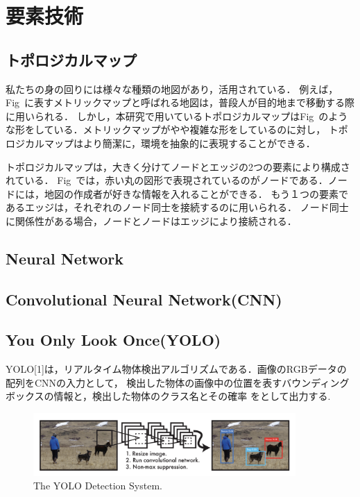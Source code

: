 \documentclass[../main]{subfiles}
\begin{document}
\setcounter{secnumdepth}{3}
    \chapter{要素技術}
        \section{トポロジカルマップ}
        私たちの身の回りには様々な種類の地図があり，活用されている．
        例えば，Fig~に表すメトリックマップと呼ばれる地図は，普段人が目的地まで移動する際に用いられる．
        しかし，本研究で用いているトポロジカルマップはFig~のような形をしている．メトリックマップがやや複雑な形をしているのに対し，
        トポロジカルマップはより簡潔に，環境を抽象的に表現することができる．

        
        トポロジカルマップは，大きく分けてノードとエッジの2つの要素により構成されている．
        Fig~では，赤い丸の図形で表現されているのがノードである．ノードには，地図の作成者が好きな情報を入れることができる．
        もう１つの要素であるエッジは，それぞれのノード同士を接続するのに用いられる．
        ノード同士に関係性がある場合，ノードとノードはエッジにより接続される．
        \section{Neural Network}
        \section{Convolutional Neural Network(CNN)}
        \section{You Only Look Once(YOLO)}
        YOLO[1]は，リアルタイム物体検出アルゴリズムである．画像のRGBデータの配列をCNNの入力として，
        検出した物体の画像中の位置を表すバウンディングボックスの情報と，検出した物体のクラス名とその確率
        をとして出力する.
        \begin{figure}[H]
        \centering
        \includegraphics[width=10cm]{yolo_exp.png}
        \caption{The YOLO Detection System.}
        \end{figure}
    
\end{document}
